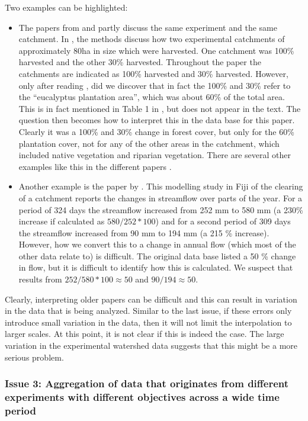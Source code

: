 \documentclass[]{elsarticle} %
\providecommand{\tightlist}{%
  \setlength{\itemsep}{0pt}\setlength{\parskip}{0pt}}
\begin{document}
Two examples can be highlighted:

\begin{itemize}
\tightlist
\item
  The papers from \citet{almeida2016} and \citet{ferreto2020} partly discuss the same experiment and the same catchment. In \citet{almeida2016}, the methods discuss how two experimental catchments of approximately 80ha in size which were harvested. One catchment was 100\% harvested and the other 30\% harvested. Throughout the paper the catchments are indicated as 100\% harvested and 30\% harvested. However, only after reading \citet{ferreto2020}, did we discover that in fact the 100\% and 30\% refer to the ``eucalyptus plantation area'', which was about 60\% of the total area. This is in fact mentioned in Table 1 in \citet{almeida2016}, but does not appear in the text. The question then becomes how to interpret this in the data base for this paper. Clearly it was a 100\% and 30\% change in forest cover, but only for the 60\% plantation cover, not for any of the other areas in the catchment, which included native vegetation and riparian vegetation. There are several other examples like this in the different papers \citep[for example][]{blackie1979kimakia, blackie1979kericho}.
\item
  Another example is the paper by \citet{waterloo2007}. This modelling study in Fiji of the clearing of a catchment reports the changes in streamflow over parts of the year. For a period of 324 days the streamflow increased from 252 mm to 580 mm (a 230\% increase if calculated as \(580/252*100\)) and for a second period of 309 days the streamflow increased from 90 mm to 194 mm (a 215 \% increase). However, how we convert this to a change in annual flow (which most of the other data relate to) is difficult. The original data base listed a 50 \% change in flow, but it is difficult to identify how this is calculated. We suspect that results from \(252/580*100 \approx 50\) and \(90/194 \approx 50\).
\end{itemize}

Clearly, interpreting older papers can be difficult and this can result in variation in the data that is being analyzed. Similar to the last issue, if these errors only introduce small variation in the data, then it will not limit the interpolation to larger scales. At this point, it is not clear if this is indeed the case. The large variation in the experimental watershed data suggests that this might be a more serious problem.

\hypertarget{issue-3-aggregation-of-data-that-originates-from-different-experiments-with-different-objectives-across-a-wide-time-period}{%
\subsubsection{Issue 3: Aggregation of data that originates from different experiments with different objectives across a wide time period}\label{issue-3-aggregation-of-data-that-originates-from-different-experiments-with-different-objectives-across-a-wide-time-period}}
\end{document}
